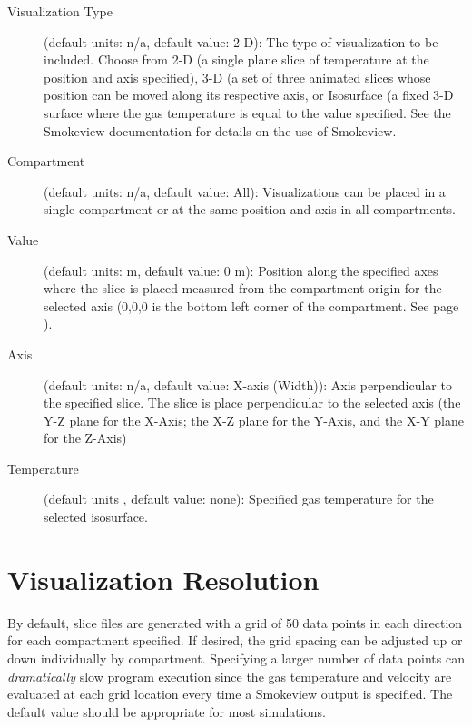 \begin{description}
\item[Visualization Type] (default units: n/a, default value: 2-D): The type of visualization to be included. Choose from 2-D (a single plane slice of temperature at the position and axis specified), 3-D (a set of three animated slices whose position can be moved along its respective axis, or Isosurface (a fixed 3-D surface where the gas temperature is equal to the value specified. See the Smokeview documentation \cite{Smokeview_Users_Guide_6} for details on the use of Smokeview.

\item[Compartment] (default units: n/a, default value: All): Visualizations can be placed in a single compartment or at the same position and axis in all compartments.

\item[Value] (default units: m, default value: 0 m): Position along the specified axes where the slice is placed measured from the compartment origin for the selected axis (0,0,0 is the bottom left corner of the compartment. See page \pageref{Compartment_Geometry}).

\item[Axis] (default units: n/a, default value: X-axis (Width)): Axis perpendicular to the specified slice.  The slice is place perpendicular to the selected axis (the Y-Z plane for the X-Axis; the X-Z plane for the Y-Axis, and the X-Y plane for the Z-Axis)

\item[Temperature] (default units \degc, default value: none): Specified gas temperature for the selected isosurface.
\end{description}


\section{Visualization Resolution}

By default, slice files are generated with a grid of 50 data points in each direction for each compartment specified. If desired, the grid spacing can be adjusted up or down individually by compartment. Specifying a larger number of data points can \textit{dramatically} slow program execution since the gas temperature and velocity are evaluated at each grid location every time a Smokeview output is specified.  The default value should be appropriate for most simulations.

